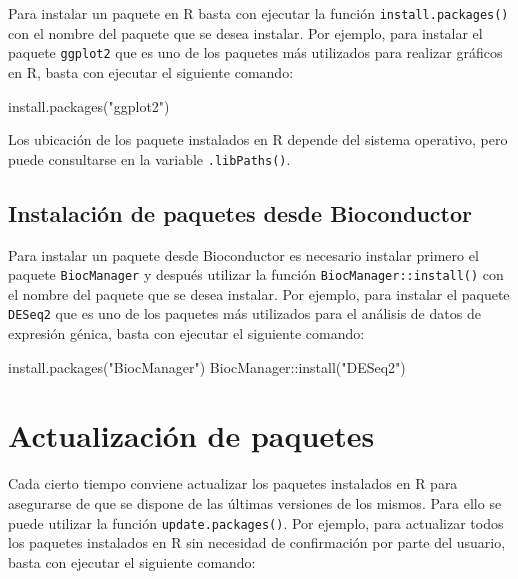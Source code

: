 \documentclass[
  a4paper,
]{scrreport}
\newenvironment{Shaded}{\begin{snugshade}}{\end{snugshade}}
\newcommand{\FunctionTok}[1]{\textcolor[rgb]{0.28,0.35,0.67}{#1}}
\newcommand{\NormalTok}[1]{\textcolor[rgb]{0.00,0.23,0.31}{#1}}
\newcommand{\SpecialCharTok}[1]{\textcolor[rgb]{0.37,0.37,0.37}{#1}}
\newcommand{\StringTok}[1]{\textcolor[rgb]{0.13,0.47,0.30}{#1}}
\theoremstyle{definition}
\theoremstyle{remark}
\begin{document}
Para instalar un paquete en R basta con ejecutar la función
\texttt{install.packages()} con el nombre del paquete que se desea
instalar. Por ejemplo, para instalar el paquete \texttt{ggplot2} que es
uno de los paquetes más utilizados para realizar gráficos en R, basta
con ejecutar el siguiente comando:

\begin{Shaded}
\begin{Highlighting}[]
\FunctionTok{install.packages}\NormalTok{(}\StringTok{"ggplot2"}\NormalTok{)}
\end{Highlighting}
\end{Shaded}

Los ubicación de los paquete instalados en R depende del sistema
operativo, pero puede consultarse en la variable \texttt{.libPaths()}.

\subsection{Instalación de paquetes desde
Bioconductor}\label{instalaciuxf3n-de-paquetes-desde-bioconductor}

Para instalar un paquete desde Bioconductor es necesario instalar
primero el paquete \texttt{BiocManager} y después utilizar la función
\texttt{BiocManager::install()} con el nombre del paquete que se desea
instalar. Por ejemplo, para instalar el paquete \texttt{DESeq2} que es
uno de los paquetes más utilizados para el análisis de datos de
expresión génica, basta con ejecutar el siguiente comando:

\begin{Shaded}
\begin{Highlighting}[]
\FunctionTok{install.packages}\NormalTok{(}\StringTok{"BiocManager"}\NormalTok{)}
\NormalTok{BiocManager}\SpecialCharTok{::}\FunctionTok{install}\NormalTok{(}\StringTok{"DESeq2"}\NormalTok{)}
\end{Highlighting}
\end{Shaded}

\section{Actualización de paquetes}\label{actualizaciuxf3n-de-paquetes}

Cada cierto tiempo conviene actualizar los paquetes instalados en R para
asegurarse de que se dispone de las últimas versiones de los mismos.
Para ello se puede utilizar la función \texttt{update.packages()}. Por
ejemplo, para actualizar todos los paquetes instalados en R sin
necesidad de confirmación por parte del usuario, basta con ejecutar el
siguiente comando:
\end{document}
